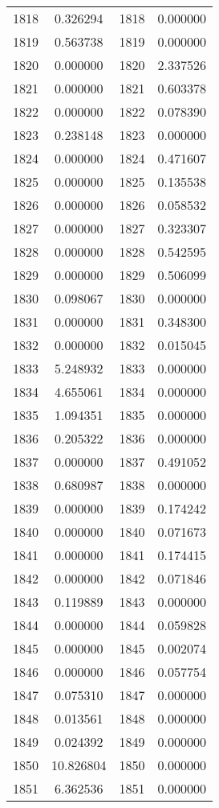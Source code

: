 \documentclass[12pt]{article}
\begin{document}
\begin{longtable}{@{}cccc@{}}
1818 & 0.326294 & 1818 & 0.000000 \\
1819 & 0.563738 & 1819 & 0.000000 \\
1820 & 0.000000 & 1820 & 2.337526 \\
1821 & 0.000000 & 1821 & 0.603378 \\
1822 & 0.000000 & 1822 & 0.078390 \\
1823 & 0.238148 & 1823 & 0.000000 \\
1824 & 0.000000 & 1824 & 0.471607 \\
1825 & 0.000000 & 1825 & 0.135538 \\
1826 & 0.000000 & 1826 & 0.058532 \\
1827 & 0.000000 & 1827 & 0.323307 \\
1828 & 0.000000 & 1828 & 0.542595 \\
1829 & 0.000000 & 1829 & 0.506099 \\
1830 & 0.098067 & 1830 & 0.000000 \\
1831 & 0.000000 & 1831 & 0.348300 \\
1832 & 0.000000 & 1832 & 0.015045 \\
1833 & 5.248932 & 1833 & 0.000000 \\
1834 & 4.655061 & 1834 & 0.000000 \\
1835 & 1.094351 & 1835 & 0.000000 \\
1836 & 0.205322 & 1836 & 0.000000 \\
1837 & 0.000000 & 1837 & 0.491052 \\
1838 & 0.680987 & 1838 & 0.000000 \\
1839 & 0.000000 & 1839 & 0.174242 \\
1840 & 0.000000 & 1840 & 0.071673 \\
1841 & 0.000000 & 1841 & 0.174415 \\
1842 & 0.000000 & 1842 & 0.071846 \\
1843 & 0.119889 & 1843 & 0.000000 \\
1844 & 0.000000 & 1844 & 0.059828 \\
1845 & 0.000000 & 1845 & 0.002074 \\
1846 & 0.000000 & 1846 & 0.057754 \\
1847 & 0.075310 & 1847 & 0.000000 \\
1848 & 0.013561 & 1848 & 0.000000 \\
1849 & 0.024392 & 1849 & 0.000000 \\
1850 & 10.826804 & 1850 & 0.000000 \\
1851 & 6.362536 & 1851 & 0.000000 \\

\end{longtable}
\end{document}
